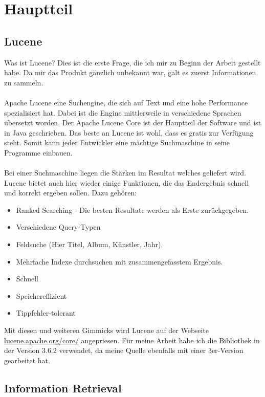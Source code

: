 \documentclass[12pt,a4paper,ngerman]{report}
\begin{document}
\chapter{Hauptteil}
\section*{Lucene}
Was ist Lucene? Dies ist die erste Frage, die ich mir zu Beginn der Arbeit gestellt habe. Da mir das Produkt gänzlich unbekannt war, galt es zuerst Informationen zu sammeln.\\
\\
Apache Lucene eine Suchengine, die sich auf Text und eine hohe Performance spezialisiert hat. Dabei ist die Engine mittlerweile in verschiedene Sprachen übersetzt worden. Der Apache Lucene Core ist der Hauptteil der Software und ist in Java geschrieben. Das beste an Lucene ist wohl, dass es gratis zur Verfügung steht. Somit kann jeder Entwickler eine mächtige Suchmaschine in seine Programme einbauen. \\
\\
Bei einer Suchmaschine liegen die Stärken im Resultat welches geliefert wird. Lucene bietet auch hier wieder einige Funktionen, die das Endergebnis schnell und korrekt ergeben sollen. Dazu gehören:
\begin{itemize}
	\item Ranked Searching - Die besten Resultate werden als Erste zurückgegeben.
	\item Verschiedene Query-Typen
	\item Feldsuche (Hier Titel, Album, Künstler, Jahr).
	\item Mehrfache Indexe durchsuchen mit zusammengefasstem Ergebnis.
	\item Schnell
	\item Speichereffizient
	\item Tippfehler-tolerant
\end{itemize}
Mit diesen und weiteren Gimmicks wird Lucene auf der Webseite \url{lucene.apache.org/core/} angepriesen. Für meine Arbeit habe ich die Bibliothek in der Version 3.6.2 verwendet, da meine Quelle ebenfalls mit einer 3er-Version gearbeitet hat.
\section*{Information Retrieval}
\end{document}
